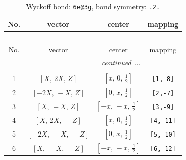 \documentclass[fleqn,8pt]{jsarticle}
\begin{document}
\renewcommand{\arraystretch}{1.2}
\begin{longtable}{cccc}
\caption{Wyckoff bond: {\tt 6e@3g}, bond symmetry: {\tt .2.}}
 \\
 \hline \hline
No. & vector & center & mapping \\ \hline \endfirsthead

\multicolumn{3}{l}{\tablename\ \thetable{}} \\
 \hline \hline
No. & vector & center & mapping \\ \hline \endhead

 \hline \hline
\multicolumn{3}{r}{\footnotesize\it continued ...} \\ \endfoot

 \hline \hline
\multicolumn{3}{r}{} \\ \endlastfoot

1 & $\left[ X,\, 2 X,\, Z \right]$ & $\left[ x,\, 0,\, \frac{1}{2} \right]$ & {\tt [1,-8]} \\ \hline
2 & $\left[ - 2 X,\, - X,\, Z \right]$ & $\left[ 0,\, x,\, \frac{1}{2} \right]$ & {\tt [2,-7]} \\ \hline
3 & $\left[ X,\, - X,\, Z \right]$ & $\left[ - x,\, - x,\, \frac{1}{2} \right]$ & {\tt [3,-9]} \\ \hline
4 & $\left[ X,\, 2 X,\, - Z \right]$ & $\left[ x,\, 0,\, \frac{1}{2} \right]$ & {\tt [4,-11]} \\ \hline
5 & $\left[ - 2 X,\, - X,\, - Z \right]$ & $\left[ 0,\, x,\, \frac{1}{2} \right]$ & {\tt [5,-10]} \\ \hline
6 & $\left[ X,\, - X,\, - Z \right]$ & $\left[ - x,\, - x,\, \frac{1}{2} \right]$ & {\tt [6,-12]} \\
\end{longtable}
\renewcommand{\arraystretch}{1.2}
\end{document}
